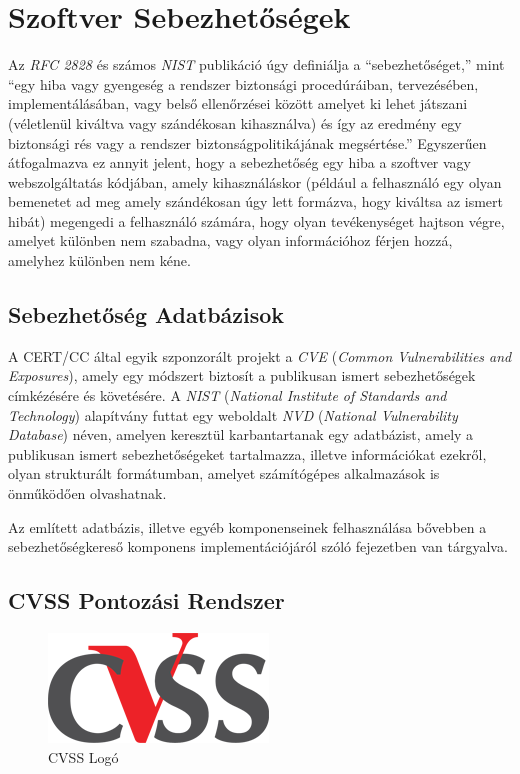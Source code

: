 \documentclass[a4paper,12pt]{article}
\begin{document}
\section{Szoftver Sebezhetőségek}
	
	Az \textit{RFC 2828} és számos \textit{NIST} publikáció úgy definiálja a ``sebezhetőséget,'' mint ``egy hiba vagy gyengeség a rendszer biztonsági procedúráiban, tervezésében, implementálásában, vagy belső ellenőrzései között amelyet ki lehet játszani (véletlenül kiváltva vagy szándékosan kihasználva) és így az eredmény egy biztonsági rés vagy a rendszer biztonságpolitikájának megsértése.''\cite{rfc2828,nist80030} Egyszerűen átfogalmazva ez annyit jelent, hogy a sebezhetőség egy hiba a szoftver vagy webszolgáltatás kódjában, amely kihasználáskor (például a felhasználó egy olyan bemenetet ad meg amely szándékosan úgy lett formázva, hogy kiváltsa az ismert hibát) megengedi a felhasználó számára, hogy olyan tevékenységet hajtson végre, amelyet különben nem szabadna, vagy olyan információhoz férjen hozzá, amelyhez különben nem kéne.
	
\subsection{Sebezhetőség Adatbázisok} \label{ssec:vulndbs}
	
	A CERT/CC által egyik szponzorált projekt a \textit{CVE} (\textit{Common Vulnerabilities and Exposures}), amely egy módszert biztosít a publikusan ismert sebezhetőségek címkézésére és követésére. A \textit{NIST} (\textit{National Institute of Standards and Technology}) alapítvány futtat egy weboldalt \textit{NVD} (\textit{National Vulnerability Database}) néven, amelyen keresztül karbantartanak egy adatbázist, amely a publikusan ismert sebezhetőségeket tartalmazza, illetve információkat ezekről, olyan strukturált formátumban, amelyet számítógépes alkalmazások is önműködően olvashatnak\cite{nvd15}.
	
	Az említett adatbázis, illetve egyéb komponenseinek felhasználása bővebben a sebezhetőségkereső komponens implementációjáról szóló fejezetben van tárgyalva.
	
\subsection{CVSS Pontozási Rendszer}
	
	\begin{figure}
		\vspace{-10pt}
		\centering
		\includegraphics[scale=0.4]{cvss.png}
		\caption{CVSS Logó}
	\end{figure}
	
\end{document}
